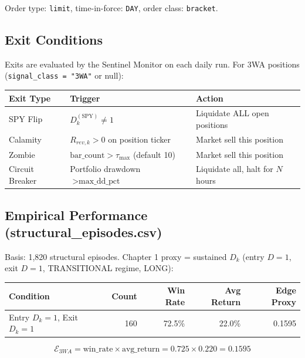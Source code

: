 \documentclass[11pt, a4paper]{article}
\begin{document}
Order type: \texttt{limit}, time-in-force: \texttt{DAY}, order class: \texttt{bracket}.

\subsection{Exit Conditions}

Exits are evaluated by the Sentinel Monitor on each daily run. For 3WA positions
(\texttt{signal\_class = "3WA"} or null):

\begin{center}
\begin{tabular}{@{}lll@{}}
\toprule
\textbf{Exit Type} & \textbf{Trigger} & \textbf{Action} \\
\midrule
SPY Flip       & $D_k^{(\text{SPY})} \neq 1$           & Liquidate ALL open positions \\
Calamity       & $R_{rev,k} > 0$ on position ticker    & Market sell this position \\
Zombie         & $\text{bar\_count} > \tau_{\max}$ (default 10) & Market sell this position \\
Circuit Breaker & Portfolio drawdown $> \text{max\_dd\_pct}$ & Liquidate all, halt for $N$ hours \\
\bottomrule
\end{tabular}
\end{center}

\subsection{Empirical Performance (structural\_episodes.csv)}

Basis: 1,820 structural episodes. Chapter 1 proxy = sustained $D_k$ (entry $D=1$,
exit $D=1$, TRANSITIONAL regime, LONG):

\begin{center}
\begin{tabular}{@{}lrrrr@{}}
\toprule
\textbf{Condition} & \textbf{Count} & \textbf{Win Rate} & \textbf{Avg Return} & \textbf{Edge Proxy} \\
\midrule
Entry $D_k=1$, Exit $D_k=1$ & 160 & 72.5\% & 22.0\% & 0.1595 \\
\bottomrule
\end{tabular}
\end{center}

\begin{equation}
  \mathcal{E}_{3WA} = \text{win\_rate} \times \text{avg\_return} = 0.725 \times 0.220 = 0.1595
\end{equation}
\end{document}
